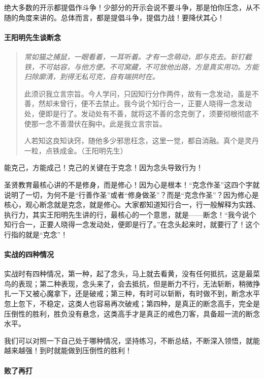 绝大多数的开示都提倡作斗争！少部分的开示会说不要斗争，那是怕你压念，从不随的角度来讲的。总体而言，都是提倡斗争，提倡力战！要降伏其心！

\paragraph{王阳明先生谈断念}

\begin{quotation}\it
    常如猫之捕鼠，一眼看着，一耳听着。才有一念萌动，即与克去。斩钉截铁，不可姑容，与他方便。不可窝藏，不可放他出路，方是真实用功。方能扫除廓清，到得无私可克，自有端拱时在。

    此须识我立言宗旨。今人学问，只因知行分作两件，故有一念发动，虽是不善，然却未曾行，便不去禁止。我今说个知行合一，正要人晓得一念发动处，便即是行了。发动处有不善，就将这不善的念克倒了，须要彻根彻底不使那一念不善潜伏在胸中。此是我立言宗旨。

    人若知这良知诀窍，随他多少邪思枉念，这里一觉，都自消融。真个是灵丹一粒，点铁成金。（王阳明先生）
\end{quotation}

能克己，方能成己！克己的关键在于克念！因为念头导致行为！

圣贤教育最核心讲的不是修身，而是修心！因为心是根本！“克念作圣”这四个字就说明了一切，为何不是“行善作圣”或者“修身做圣”？而是“克念作圣”？因为修心是核心，观心断念就是克念，就是修心。大家都知道知行合一，行一般解释为实践、执行力，其实王阳明先生讲的行，最核心的一个意思，就是——断念！“我今说个知行合一，正要人晓得一念发动处，便即是行了。”在念头起来时，就要行了！这个行指的就是“克念”！

\paragraph{实战的四种情况}

实战时有四种情况，第一种，起了念头，马上就去看黄，没有任何抵抗，这是最菜鸟的表现；第二种表现，念头来了，会去抵抗，但是断力不行，无法斩断，稍微挣扎一下又被心魔拿下，还是破戒；第三种，有时可以斩断，有时做不到，断念水平忽上忽下，不稳定，这类人也容易再次破戒；第四种，是真正的断念高手，完全是压倒性的胜利，胜负没有悬念，这类高手才是真正的戒色刀客，具备超一流的断念水平。

我们可以对照一下自己处于哪种情况，坚持练习，不断总结，不断深入领悟，就能越来越强！到时就能做到压倒性的胜利！

\paragraph{败了再打}

